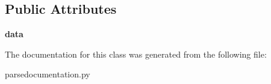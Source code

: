 \subsection*{Public Attributes}
\begin{DoxyCompactItemize}
\item 
\mbox{\label{classparsedocumentation_1_1DoxygenParser_afbd20fe668583aeb43b296e9140785c3}} 
{\bfseries data}
\end{DoxyCompactItemize}


The documentation for this class was generated from the following file\+:\begin{DoxyCompactItemize}
\item 
parsedocumentation.\+py\end{DoxyCompactItemize}
